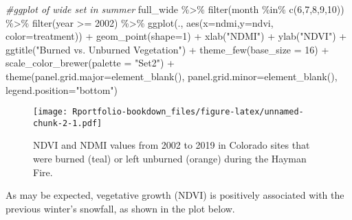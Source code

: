 \documentclass[
]{book}
\newenvironment{Shaded}{\begin{snugshade}}{\end{snugshade}}
\newcommand{\AttributeTok}[1]{\textcolor[rgb]{0.77,0.63,0.00}{#1}}
\newcommand{\CommentTok}[1]{\textcolor[rgb]{0.56,0.35,0.01}{\textit{#1}}}
\newcommand{\DecValTok}[1]{\textcolor[rgb]{0.00,0.00,0.81}{#1}}
\newcommand{\FunctionTok}[1]{\textcolor[rgb]{0.00,0.00,0.00}{#1}}
\newcommand{\NormalTok}[1]{#1}
\newcommand{\SpecialCharTok}[1]{\textcolor[rgb]{0.00,0.00,0.00}{#1}}
\newcommand{\StringTok}[1]{\textcolor[rgb]{0.31,0.60,0.02}{#1}}
\begin{document}
\begin{Shaded}
\begin{Highlighting}[]
\CommentTok{\#ggplot of wide set in summer}
\NormalTok{full\_wide }\SpecialCharTok{\%\textgreater{}\%}
  \FunctionTok{filter}\NormalTok{(month }\SpecialCharTok{\%in\%} \FunctionTok{c}\NormalTok{(}\DecValTok{6}\NormalTok{,}\DecValTok{7}\NormalTok{,}\DecValTok{8}\NormalTok{,}\DecValTok{9}\NormalTok{,}\DecValTok{10}\NormalTok{)) }\SpecialCharTok{\%\textgreater{}\%}
  \FunctionTok{filter}\NormalTok{(year }\SpecialCharTok{\textgreater{}=} \DecValTok{2002}\NormalTok{) }\SpecialCharTok{\%\textgreater{}\%}
\FunctionTok{ggplot}\NormalTok{(., }\FunctionTok{aes}\NormalTok{(}\AttributeTok{x=}\NormalTok{ndmi,}\AttributeTok{y=}\NormalTok{ndvi, }\AttributeTok{color=}\NormalTok{treatment)) }\SpecialCharTok{+} 
  \FunctionTok{geom\_point}\NormalTok{(}\AttributeTok{shape=}\DecValTok{1}\NormalTok{) }\SpecialCharTok{+} 
  \FunctionTok{xlab}\NormalTok{(}\StringTok{"NDMI"}\NormalTok{) }\SpecialCharTok{+} \FunctionTok{ylab}\NormalTok{(}\StringTok{"NDVI"}\NormalTok{) }\SpecialCharTok{+}
  \FunctionTok{ggtitle}\NormalTok{(}\StringTok{"Burned vs. Unburned Vegetation"}\NormalTok{) }\SpecialCharTok{+}
  \FunctionTok{theme\_few}\NormalTok{(}\AttributeTok{base\_size =} \DecValTok{16}\NormalTok{) }\SpecialCharTok{+}
  \FunctionTok{scale\_color\_brewer}\NormalTok{(}\AttributeTok{palette =} \StringTok{"Set2"}\NormalTok{) }\SpecialCharTok{+}
  \FunctionTok{theme}\NormalTok{(}\AttributeTok{panel.grid.major=}\FunctionTok{element\_blank}\NormalTok{(), }\AttributeTok{panel.grid.minor=}\FunctionTok{element\_blank}\NormalTok{(), }\AttributeTok{legend.position=}\StringTok{"bottom"}\NormalTok{)}
\end{Highlighting}
\end{Shaded}

\begin{figure}
\centering
\texttt{[image: Rportfolio-bookdown\_files/figure-latex/unnamed-chunk-2-1.pdf]}
\caption{\label{fig:unnamed-chunk-2}NDVI and NDMI values from 2002 to 2019 in Colorado sites that were burned (teal) or left unburned (orange) during the Hayman Fire.}
\end{figure}

As may be expected, vegetative growth (NDVI) is positively associated with the previous winter's snowfall, as shown in the plot below.
\end{document}
